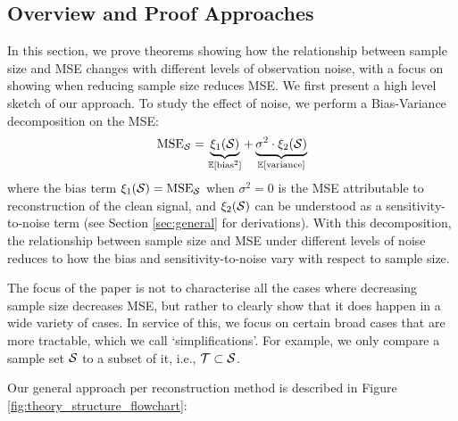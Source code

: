\subsection{Overview and Proof Approaches}
\label{sec:theory-overview}
In this section, we prove theorems showing how the relationship between sample size and MSE changes with different levels of observation noise, with a focus on showing when reducing sample size reduces MSE. We first present a high level sketch of our approach. To study the effect of noise, we perform a Bias-Variance decomposition on the MSE:
\begin{equation}
    \textrm{MSE}_{\set{S}} = \underbrace{\xi_{1}(\set{S})}_{\expect{\text{bias}^{2}}} + \underbrace{\sigma^{2} \cdot \xi_{2}(\set{S})}_{\expect{\text{variance}}} 
\end{equation}
where the bias term $\xi_{1}(\mathcal{S}) = \text{MSE}_{\mathcal{S}}$ when $\sigma^{2} = 0$ is the MSE attributable to reconstruction of the clean signal, and $\xi_{2}(\mathcal{S})$ can be understood as a sensitivity-to-noise term (see Section \ref{sec:general} for derivations).
With this decomposition, the relationship between sample size and MSE under different levels of noise reduces to how the bias and sensitivity-to-noise vary with respect to sample size. 

The focus of the paper is not to characterise all the cases where decreasing sample size decreases MSE, but rather to clearly show that it does happen in a wide variety of cases. In service of this, we focus on certain broad cases that are more tractable, which we call `simplifications'. For example, we only compare a sample set $\mathcal{S}$ to a subset of it, i.e., $\mathcal{T} \subset \mathcal{S}$.

\begin{mccorrection}
Our general approach per reconstruction method is described in Figure \ref{fig:theory_structure_flowchart}:
\end{mccorrection}

